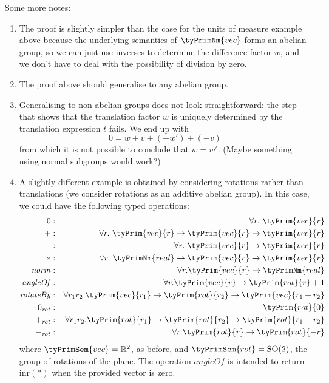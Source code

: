 Some more notes:
\begin{enumerate}
\item The proof is slightly simpler than the case for the units of
  measure example above because the underlying semantics of
  $\tyPrimNm{vec}$ forms an abelian group, so we can just use inverses
  to determine the difference factor $w$, and we don't have to deal
  with the possibility of division by zero.
\item The proof above should generalise to any abelian group.
\item Generalising to non-abelian groups does not look
  straightforward: the step that shows that the translation factor $w$
  is uniquely determined by the translation expression $t$ fails. We
  end up with
  \begin{displaymath}
    0 = w + v + (-w') + (-v)
  \end{displaymath}
  from which it is not possible to conclude that $w = w'$. (Maybe
  something using normal subgroups would work?)
\item A slightly different example is obtained by considering
  rotations rather than translations (we consider rotations as an
  additive abelian group). In this case, we could have the following
  typed operations:
  \begin{eqnarray*}
    0 & : & \forall r.\ \tyPrim{vec}{r} \\
    + & : & \forall r.\ \tyPrim{vec}{r} \to \tyPrim{vec}{r} \to \tyPrim{vec}{r} \\
    - & : & \forall r.\ \tyPrim{vec}{r} \to \tyPrim{vec}{r} \\
    * & : & \forall r.\ \tyPrimNm{real} \to \tyPrim{vec}{r} \to \tyPrim{vec}{r} \\
    \mathit{norm} & : & \forall r. \tyPrim{vec}{r} \to \tyPrimNm{real} \\
    \mathit{angleOf} & : & \forall r. \tyPrim{vec}{r} \to \tyPrim{rot}{r} + 1 \\
    \mathit{rotateBy} & : & \forall r_1 r_2. \tyPrim{vec}{r_1} \to \tyPrim{rot}{r_2} \to \tyPrim{vec}{r_1 + r_2} \\
    0_{\mathit{rot}} & : & \tyPrim{rot}{0} \\
    +_{\mathit{rot}} & : & \forall r_1 r_2. \tyPrim{rot}{r_1} \to \tyPrim{rot}{r_2} \to \tyPrim{rot}{r_1 + r_2} \\
    -_{\mathit{rot}} & : & \forall r. \tyPrim{rot}{r} \to \tyPrim{rot}{-r}
  \end{eqnarray*}
  where $\tyPrimSem{vec} = \mathbb{R}^2$, as before, and
  $\tyPrimSem{rot} = \mathrm{SO}(2)$, the group of rotations of the
  plane. The operation $\mathit{angleOf}$ is intended to return
  $\mathrm{inr}(*)$ when the provided vector is zero.


\end{enumerate}
